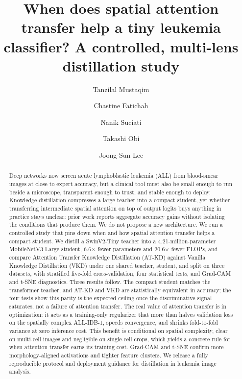 \documentclass[preprint,review,12pt]{elsarticle}
\begin{document}
\begin{frontmatter}

\title{When does spatial attention transfer help a tiny leukemia
classifier? A controlled, multi-lens distillation study}

\author[its,telkom]{Tanzilal Mustaqim}
\author[its]{Chastine Fatichah}
\author[its]{Nanik Suciati}
\author[tok]{Takashi Obi}
\author[tok,kw]{Joong-Sun Lee}


\begin{abstract}
Deep networks now screen acute lymphoblastic leukemia (ALL) from
blood-smear images at close to expert accuracy, but a clinical tool must
also be small enough to run beside a microscope, transparent enough to
trust, and stable enough to deploy. Knowledge distillation compresses a
large teacher into a compact student, yet whether transferring
intermediate spatial attention on top of output logits buys anything in
practice stays unclear: prior work reports aggregate accuracy gains
without isolating the conditions that produce them. We do not propose a
new architecture. We run a controlled study that pins down when and how
spatial attention transfer helps a compact student. We distill a
SwinV2-Tiny teacher into a 4.21-million-parameter MobileNetV3-Large
student, 6.6$\times$ fewer parameters and 20.6$\times$ fewer FLOPs, and
compare Attention Transfer Knowledge Distillation (AT-KD) against Vanilla
Knowledge Distillation (VKD) under one shared teacher, student, and split
on three datasets, with stratified five-fold cross-validation, four
statistical tests, and Grad-CAM and t-SNE diagnostics. Three results
follow. The compact student matches the transformer teacher, and AT-KD
and VKD are statistically equivalent in accuracy; the four tests show
this parity is the expected ceiling once the discriminative signal
saturates, not a failure of attention transfer. The real value of
attention transfer is in optimization: it acts as a training-only
regularizer that more than halves validation loss on the spatially
complex ALL-IDB-1, speeds convergence, and shrinks fold-to-fold variance
at zero inference cost. This benefit is conditional on spatial
complexity, clear on multi-cell images and negligible on single-cell
crops, which yields a concrete rule for when attention transfer earns its
training cost. Grad-CAM and t-SNE confirm more morphology-aligned
activations and tighter feature clusters. We release a fully reproducible
protocol and deployment guidance for distillation in leukemia image
analysis.
\end{abstract}


\end{frontmatter}
\end{document}
